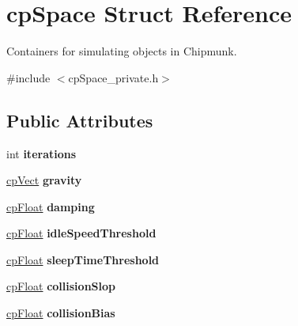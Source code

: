 \hypertarget{structcp_space}{}\section{cp\+Space Struct Reference}
\label{structcp_space}


Containers for simulating objects in Chipmunk.  




{\ttfamily \#include $<$cp\+Space\+\_\+private.\+h$>$}

\subsection*{Public Attributes}
\begin{DoxyCompactItemize}
\item 
\hypertarget{structcp_space_af278fb3ab6ec903acd2fe49ee821fcf8}{}int {\bfseries iterations}\label{structcp_space_af278fb3ab6ec903acd2fe49ee821fcf8}

\item 
\hypertarget{structcp_space_a93479d52c441a2e3b36716d9a9d55852}{}\hyperlink{structcp_vect}{cp\+Vect} {\bfseries gravity}\label{structcp_space_a93479d52c441a2e3b36716d9a9d55852}

\item 
\hypertarget{structcp_space_a421f86b111318e2eced602c6930fffaa}{}\hyperlink{group__basic_types_gac1ed65573e035bf892505768c852d8d3}{cp\+Float} {\bfseries damping}\label{structcp_space_a421f86b111318e2eced602c6930fffaa}

\item 
\hypertarget{structcp_space_a88ffce371610f2b94997160de703f1cd}{}\hyperlink{group__basic_types_gac1ed65573e035bf892505768c852d8d3}{cp\+Float} {\bfseries idle\+Speed\+Threshold}\label{structcp_space_a88ffce371610f2b94997160de703f1cd}

\item 
\hypertarget{structcp_space_a928d74741904aae266a9efff5b5f68f7}{}\hyperlink{group__basic_types_gac1ed65573e035bf892505768c852d8d3}{cp\+Float} {\bfseries sleep\+Time\+Threshold}\label{structcp_space_a928d74741904aae266a9efff5b5f68f7}

\item 
\hypertarget{structcp_space_af1bec644a24e12bfc642a942a88520f7}{}\hyperlink{group__basic_types_gac1ed65573e035bf892505768c852d8d3}{cp\+Float} {\bfseries collision\+Slop}\label{structcp_space_af1bec644a24e12bfc642a942a88520f7}

\item 
\hypertarget{structcp_space_a8f5a7d2a5cf25b1f18d05e9b31a87ad9}{}\hyperlink{group__basic_types_gac1ed65573e035bf892505768c852d8d3}{cp\+Float} {\bfseries collision\+Bias}\label{structcp_space_a8f5a7d2a5cf25b1f18d05e9b31a87ad9}


\end{DoxyCompactItemize}
